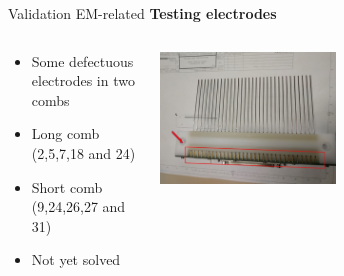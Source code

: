 \documentclass[utf8]{beamer} \usetheme{lfcr} %
\begin{document}
\begin{frame}{Validation}
  {EM-related}
  \textbf{Testing electrodes}

  \begin{columns}
    \begin{column}{0.5\textwidth}
      \begin{itemize}
        \item Some defectuous electrodes in two combs
        \item Long comb (2,5,7,18 and 24)
        \item Short comb (9,24,26,27 and 31)
        \item Not yet solved
      \end{itemize}
    \end{column}
    \begin{column}{\textwidth}
        \includegraphics[width=0.5\textwidth]{peigne_long.jpg}
    \end{column}
  \end{columns}

\end{frame}
%
\end{document}
